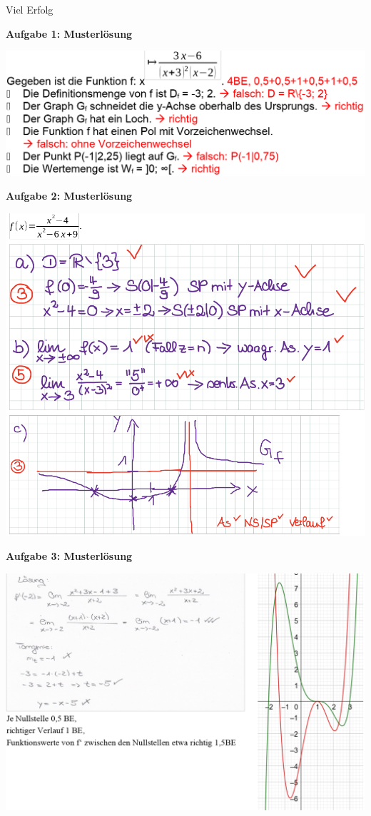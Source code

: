 \documentclass[a4paper,12pt]{article}
\newcommand{\Aufgabe}[1]{
  {
  \vspace*{0.5cm}
  \textsf{\textbf{Aufgabe #1}}
  \vspace*{0.2cm}
  
  }
}
\begin{document}
\vspace{3cm}

\centerline{Viel Erfolg}







\newpage
\Aufgabe{1: Musterlösung}
\includegraphics[width=\linewidth]{Q11_1KlausurJanuar2022_ml1.png}

\Aufgabe{2: Musterlösung}
\includegraphics[width=\linewidth]{Q11_1KlausurJanuar2022_ml2.png}

\newpage
\Aufgabe{3: Musterlösung}
\includegraphics[width=\linewidth]{Q11_1KlausurJanuar2022_ml3a.png}
\end{document}
